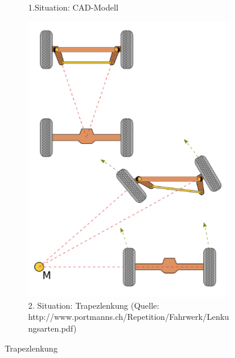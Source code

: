 \begin{figure} [hbp]
\begin{subfigure}[b]{0.4\textwidth}
		\caption{1.Situation: CAD-Modell}
	\end{subfigure}
	\hfill
	\begin{subfigure}[b]{0.36\textwidth}
		\includegraphics[width=\textwidth]{fig/Lenktrapez.png}
		\caption{2. Situation: Trapezlenkung
		(Quelle: http://www.portmanns.ch/Repetition/Fahrwerk/Lenkungsarten.pdf)}
\end{subfigure}
	\caption{Trapezlenkung}\label{fig:animals}
\end{figure}

